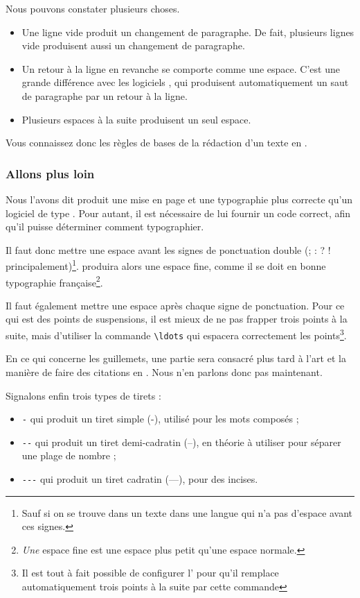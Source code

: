 Nous pouvons constater plusieurs choses.
\begin{itemize}
\item Une ligne vide produit un changement de paragraphe. De fait, plusieurs lignes vide produisent aussi un changement de paragraphe.
\item Un retour à la ligne en revanche se comporte comme une espace. C'est une grande différence avec les logiciels , qui produisent automatiquement un saut de paragraphe par un retour à la ligne.
\item Plusieurs espaces à la suite produisent un seul espace. 
\end{itemize}

Vous connaissez donc les règles de bases de la rédaction d'un texte en \logiciel{\LaTeX}.

\subsubsection{Allons plus loin}


Nous l'avons dit \logiciel{\LaTeX} produit une mise en page et une typographie plus correcte qu'un logiciel de type . Pour autant, il est nécessaire de lui fournir un code correct, afin qu'il puisse déterminer comment typographier.

Il faut donc mettre une espace avant les signes de ponctuation double (; : ? ! principalement)\footnote{Sauf si on se trouve dans un texte dans une langue qui n'a pas d'espace avant ces signes.}. \logiciel{\LaTeX} produira alors une espace fine, comme il se doit en bonne typographie fran\c caise\footnote{\emph{Une} espace fine est une espace plus petit qu'une espace normale.}.

Il faut également mettre une espace après chaque signe de ponctuation. Pour ce qui est des points de suspensions, il est mieux de ne pas frapper trois points à la suite, mais d'utiliser la commande \verb|\ldots| qui espacera correctement les points\footnote{Il est tout à fait possible de configurer l' pour qu'il remplace automatiquement trois points à la suite par cette commande}.

En ce qui concerne les guillemets, une partie sera consacré plus tard à l'art et la manière de faire des citations en \logiciel{\LaTeX}. Nous n'en parlons donc pas maintenant.

Signalons enfin trois types de tirets :
\begin{itemize}
\item \verb|-| qui produit un tiret simple (-), utilisé pour les mots composés ;
\item \verb|--| qui produit un tiret demi-cadratin (--), en théorie à utiliser pour séparer une plage de nombre ;
\item \verb|---| qui produit un tiret cadratin (---), pour des incises.
\end{itemize}
 

